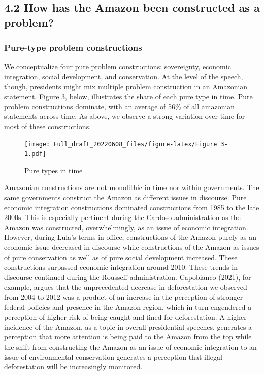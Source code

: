 \documentclass[
]{article}
\begin{document}
\hypertarget{how-has-the-amazon-been-constructed-as-a-problem}{%
\subsection{4.2 How has the Amazon been constructed as a
problem?}\label{how-has-the-amazon-been-constructed-as-a-problem}}

\hypertarget{pure-type-problem-constructions}{%
\subsubsection{Pure-type problem
constructions}\label{pure-type-problem-constructions}}

We conceptualize four pure problem constructions: sovereignty, economic
integration, social development, and conservation. At the level of the
speech, though, presidents might mix multiple problem construction in an
Amazonian statement. Figure 3, below, illustrates the share of each pure
type in time. Pure problem constructions dominate, with an average of
56\% of all amazonian statements across time. As above, we observe a
strong variation over time for most of these constructions.

\begin{figure}
\centering
\texttt{[image: Full\_draft\_20220608\_files/figure-latex/Figure 3-1.pdf]}
\caption{Pure types in time}
\end{figure}

Amazonian constructions are not monolithic in time nor within
governments. The same governments construct the Amazon as different
issues in discourse. Pure economic integration constructions dominated
constructions from 1985 to the late 2000s. This is especially pertinent
during the Cardoso administration as the Amazon was constructed,
overwhelmingly, as an issue of economic integration. However, during
Lula's terms in office, constructions of the Amazon purely as an
economic issue decreased in discourse while constructions of the Amazon
as issues of pure conservation as well as of pure social development
increased. These constructions surpassed economic integration around
2010. These trends in discourse continued during the Rousseff
administration. Capobianco (2021), for example, argues that the
unprecedented decrease in deforestation we observed from 2004 to 2012
was a product of an increase in the perception of stronger federal
policies and presence in the Amazon region, which in turn engendered a
perception of higher risk of being caught and fined for deforestation. A
higher incidence of the Amazon, as a topic in overall presidential
speeches, generates a perception that more attention is being paid to
the Amazon from the top while the shift from constructing the Amazon as
an issue of economic integration to an issue of environmental
conservation generates a perception that illegal deforestation will be
increasingly monitored.
\end{document}
